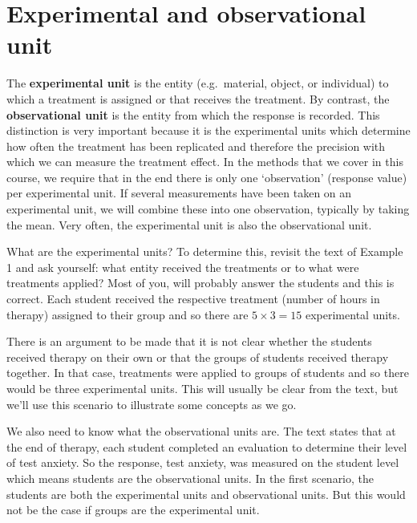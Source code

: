 \documentclass[
  letterpaper,
]{book}
\begin{document}
\section*{\texorpdfstring{\textbf{Experimental and observational
unit}}{Experimental and observational unit}}\label{experimental-and-observational-unit}


The \textbf{experimental unit} is the entity (e.g.~material, object, or
individual) to which a treatment is assigned or that receives the
treatment. By contrast, the \textbf{observational unit} is the entity
from which the response is recorded. This distinction is very important
because it is the experimental units which determine how often the
treatment has been replicated and therefore the precision with which we
can measure the treatment effect. In the methods that we cover in this
course, we require that in the end there is only one `observation'
(response value) per experimental unit. If several measurements have
been taken on an experimental unit, we will combine these into one
observation, typically by taking the mean. Very often, the experimental
unit is also the observational unit.

What are the experimental units? To determine this, revisit the text of
Example 1 and ask yourself: what entity received the treatments or to
what were treatments applied? Most of you, will probably answer the
students and this is correct. Each student received the respective
treatment (number of hours in therapy) assigned to their group and so
there are \(5 \times 3 = 15\) experimental units.

There is an argument to be made that it is not clear whether the
students received therapy on their own or that the groups of students
received therapy together. In that case, treatments were applied to
groups of students and so there would be three experimental units. This
will usually be clear from the text, but we'll use this scenario to
illustrate some concepts as we go.

We also need to know what the observational units are. The text states
that at the end of therapy, each student completed an evaluation to
determine their level of test anxiety. So the response, test anxiety,
was measured on the student level which means students are the
observational units. In the first scenario, the students are both the
experimental units and observational units. But this would not be the
case if groups are the experimental unit.
\end{document}
